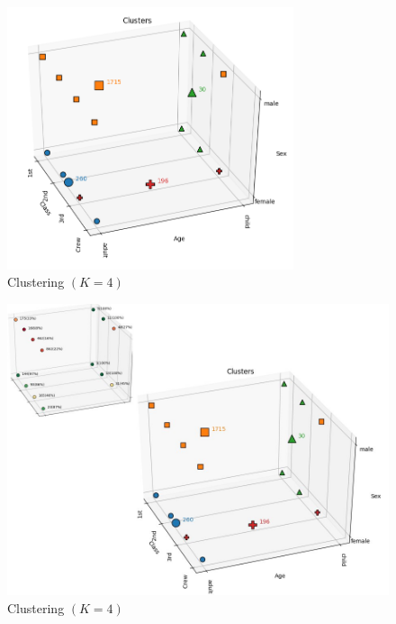\documentclass{beamer}
\begin{document}
\begin{frame}[plain]
    \begin{figure}[H]
        \begin{center}
            \includegraphics[width=0.75\textwidth]{ex1_clusters}
        \end{center}
        \caption{Clustering $(K=4)$}
        \label{Clustering}
    \end{figure}
\end{frame}

\begin{frame}[plain]
    \begin{figure}[H]
        \begin{center}
            \includegraphics[width=1\textwidth]{survived_clusters}
        \end{center}
        \caption{Clustering $(K=4)$}
        \label{Clustering}
    \end{figure}
\end{frame}
\end{document}

